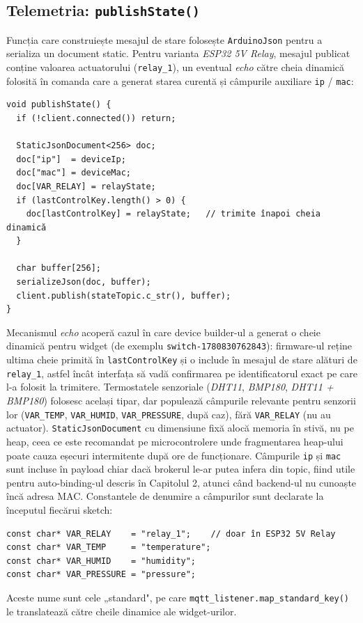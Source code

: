 \subsection{Telemetria: \texttt{publishState()}}
Funcția care construiește mesajul de stare folosește \texttt{ArduinoJson} pentru a serializa un document static. Pentru varianta \emph{ESP32 5V Relay}, mesajul publicat conține valoarea actuatorului (\texttt{relay\_1}), un eventual \emph{echo} către cheia dinamică folosită în comanda care a generat starea curentă și câmpurile auxiliare \texttt{ip} / \texttt{mac}:
\begin{verbatim}
void publishState() {
  if (!client.connected()) return;

  StaticJsonDocument<256> doc;
  doc["ip"]  = deviceIp;
  doc["mac"] = deviceMac;
  doc[VAR_RELAY] = relayState;
  if (lastControlKey.length() > 0) {
    doc[lastControlKey] = relayState;   // trimite înapoi cheia dinamică
  }

  char buffer[256];
  serializeJson(doc, buffer);
  client.publish(stateTopic.c_str(), buffer);
}
\end{verbatim}
Mecanismul \emph{echo} acoperă cazul în care device builder-ul a generat o cheie dinamică pentru widget (de exemplu \texttt{switch-1780830762843}): firmware-ul reține ultima cheie primită în \texttt{lastControlKey} și o include în mesajul de stare alături de \texttt{relay\_1}, astfel încât interfața să vadă confirmarea pe identificatorul exact pe care l-a folosit la trimitere. Termostatele senzoriale (\emph{DHT11}, \emph{BMP180}, \emph{DHT11 + BMP180}) folosesc același tipar, dar populează câmpurile relevante pentru senzorii lor (\texttt{VAR\_TEMP}, \texttt{VAR\_HUMID}, \texttt{VAR\_PRESSURE}, după caz), fără \texttt{VAR\_RELAY} (nu au actuator). \texttt{StaticJsonDocument} cu dimensiune fixă alocă memoria în stivă, nu pe heap, ceea ce este recomandat pe microcontrolere unde fragmentarea heap-ului poate cauza eșecuri intermitente după ore de funcționare. Câmpurile \texttt{ip} și \texttt{mac} sunt incluse în payload chiar dacă brokerul le-ar putea infera din topic, fiind utile pentru auto-binding-ul descris în Capitolul 2, atunci când backend-ul nu cunoaște încă adresa MAC. Constantele de denumire a câmpurilor sunt declarate la începutul fiecărui sketch:
\begin{verbatim}
const char* VAR_RELAY    = "relay_1";    // doar în ESP32 5V Relay
const char* VAR_TEMP     = "temperature";
const char* VAR_HUMID    = "humidity";
const char* VAR_PRESSURE = "pressure";
\end{verbatim}
Aceste nume sunt cele „standard", pe care \texttt{mqtt\_listener.map\_standard\_key()} le translatează către cheile dinamice ale widget-urilor.

